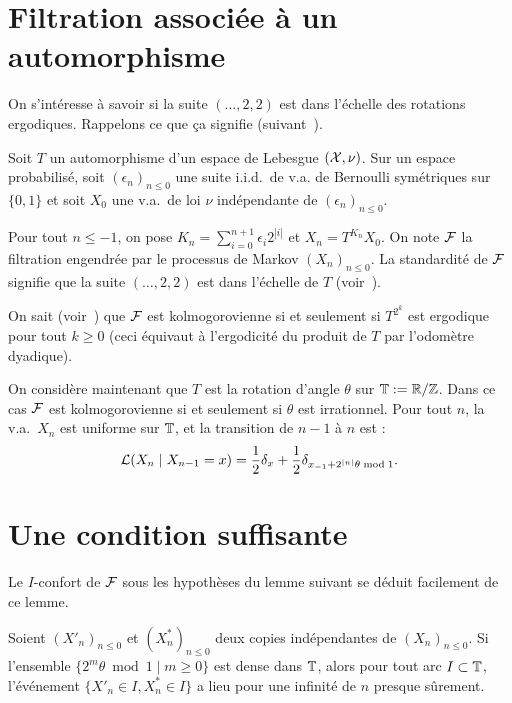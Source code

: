 \documentclass[12pt,a4paper]{article}
\begin{document}
\section{Filtration associée à un automorphisme}

On s'intéresse à savoir si la suite $(\ldots, 2, 2)$ est dans l'échelle 
des rotations ergodiques. 
Rappelons ce que ça signifie (suivant~\cite{LauXLV}).

Soit $T$ un automorphisme d'un espace de Lebesgue $(\mathcal{X},\nu)$. 
Sur un espace probabilisé, soit ${(\epsilon_n)}_{n \leq 0}$ 
une suite i.i.d.\ de v.a. de Bernoulli symétriques sur $\{0,1\}$ 
et soit $X_0$ une v.a.\ de loi $\nu$ 
 indépendante de ${(\epsilon_n)}_{n \leq 0}$. 

Pour tout $n \leq -1$, on pose $K_n = \sum_{i=0}^{n+1} \epsilon_i2^{|i|}$ 
et $X_n = T^{K_n}X_0$. 
On note $\mathcal{F}$ la filtration engendrée par le processus de Markov 
${(X_n)}_{n \leq 0}$. 
La standardité de $\mathcal{F}$ signifie que la suite $(\ldots, 2, 2)$ est dans l'échelle 
de $T$ (voir~\cite{LauXLV}). 

On sait (voir~\cite{LauXLV}) que $\mathcal{F}$ est kolmogorovienne si et seulement si 
$T^{2^k}$ est ergodique pour tout $k \geq 0$ 
(ceci équivaut à l'ergodicité du produit de $T$ par l'odomètre dyadique). 


On considère maintenant que 
$T$ est la rotation d'angle $\theta$ sur $\mathbb{T}:=\mathbb{R}/\mathbb{Z}$. 
Dans ce cas $\mathcal{F}$ est kolmogorovienne si et seulement si $\theta$ est irrationnel. 
Pour tout $n$, la v.a.\ $X_n$ est uniforme sur $\mathbb{T}$, et 
la transition de $n-1$ à $n$ est :
$$
\mathcal{L}(X_n \mid X_{n-1}=x) = \frac12 \delta_{x} + \frac12 \delta_{x_{-1} + 2^{|n|}\theta \bmod 1}.  
$$



\section{Une condition suffisante}


Le $I$-confort de $\mathcal{F}$ sous les hypothèses du lemme suivant 
se déduit facilement de ce lemme.  

\begin{lemme}
Soient ${(X'_n)}_{n \leq 0}$ et ${(X^*_n)}_{n \leq 0}$ deux copies indépendantes 
de ${(X_{n})}_{n \leq 0}$. Si l'ensemble $\{2^m\theta\bmod 1 \mid m \geq 0\}$ est dense 
dans $\mathbb{T}$, alors pour tout arc $I \subset \mathbb{T}$, l'événement $\{X'_n \in I, X^*_n \in I\}$ 
a lieu pour une infinité de $n$ presque sûrement.
\end{lemme}
\end{document}
